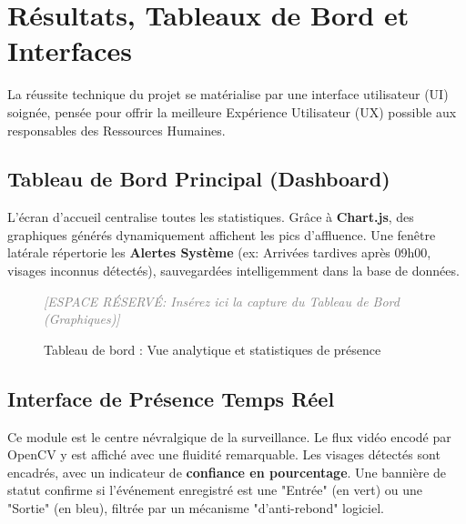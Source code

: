 \documentclass[12pt,a4paper]{report}
\begin{document}
\chapter{Résultats, Tableaux de Bord et Interfaces}

La réussite technique du projet se matérialise par une interface utilisateur (UI) soignée, pensée pour offrir la meilleure Expérience Utilisateur (UX) possible aux responsables des Ressources Humaines.

\section{Tableau de Bord Principal (Dashboard)}
L'écran d'accueil centralise toutes les statistiques. Grâce à \textbf{Chart.js}, des graphiques générés dynamiquement affichent les pics d'affluence. Une fenêtre latérale répertorie les \textbf{Alertes Système} (ex: Arrivées tardives après 09h00, visages inconnus détectés), sauvegardées intelligemment dans la base de données.

\begin{figure}[H]
    \centering
    \begin{tcolorbox}[colback=lightbg, colframe=primary, width=0.95\textwidth, height=7cm, valign=center, halign=center, arc=2mm]
        \textcolor{gray}{\Large \textit{[ESPACE RÉSERVÉ: Insérez ici la capture du Tableau de Bord (Graphiques)]}}
    \end{tcolorbox}
    \caption{Tableau de bord : Vue analytique et statistiques de présence}
\end{figure}

\section{Interface de Présence Temps Réel}
Ce module est le centre névralgique de la surveillance. Le flux vidéo encodé par OpenCV y est affiché avec une fluidité remarquable. Les visages détectés sont encadrés, avec un indicateur de \textbf{confiance en pourcentage}. Une bannière de statut confirme si l'événement enregistré est une "Entrée" (en vert) ou une "Sortie" (en bleu), filtrée par un mécanisme "d'anti-rebond" logiciel.
\end{document}
